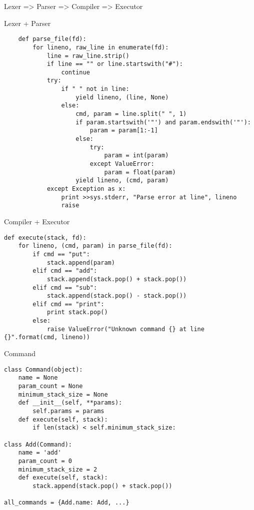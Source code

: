 \documentclass{article}
\begin{document}
\begin{center}Lexer => Parser => Compiler => Executor\end{center}
\begin{center}Lexer + Parser\end{center}
\begin{lstlisting}
    def parse_file(fd):
        for lineno, raw_line in enumerate(fd):
            line = raw_line.strip()
            if line == "" or line.startswith("#"):
                continue
            try:
                if " " not in line:
                    yield lineno, (line, None)
                else:
                    cmd, param = line.split(" ", 1)
                    if param.startswith('"') and param.endswith('"'):
                        param = param[1:-1]
                    else:
                        try:
                            param = int(param)
                        except ValueError:
                            param = float(param)
                    yield lineno, (cmd, param)
            except Exception as x:
                print >>sys.stderr, "Parse error at line", lineno
                raise
\end{lstlisting}
\newpage

\begin{center}Compiler + Executor\end{center}
\begin{lstlisting}
def execute(stack, fd):
    for lineno, (cmd, param) in parse_file(fd):
        if cmd == "put":
            stack.append(param)
        elif cmd == "add":
            stack.append(stack.pop() + stack.pop())
        elif cmd == "sub":
            stack.append(stack.pop() - stack.pop())
        elif cmd == "print":
            print stack.pop()
        else:
            raise ValueError("Unknown command {} at line {}".format(cmd, lineno))
\end{lstlisting}
\newpage

\begin{center}Command\end{center}
\begin{lstlisting}
class Command(object):
    name = None
    param_count = None
    minimum_stack_size = None
    def __init__(self, **params):
        self.params = params
    def execute(self, stack):
        if len(stack) < self.minimum_stack_size:

class Add(Command):
    name = 'add'
    param_count = 0
    minimum_stack_size = 2
    def execute(self, stack):
        stack.append(stack.pop() + stack.pop())

all_commands = {Add.name: Add, ...}
\end{lstlisting}
\newpage
\end{document}
